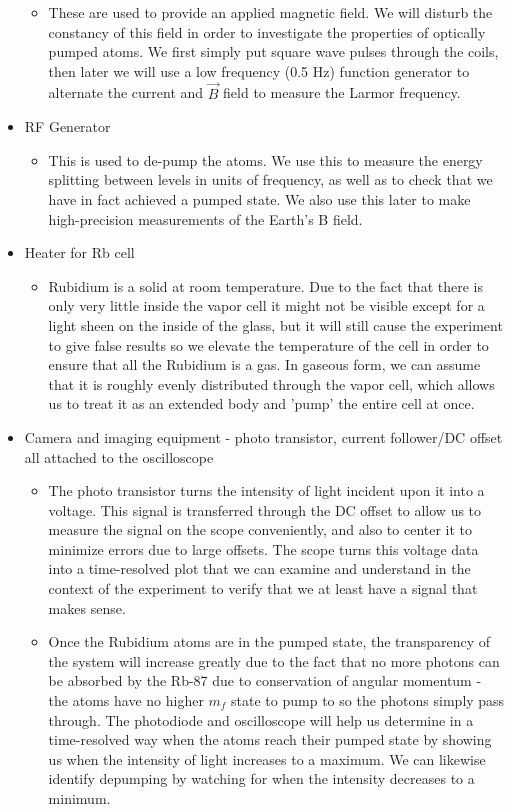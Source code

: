 \documentclass{article}
\begin{document}
\begin{itemize}
\begin{itemize}
      \item These are used to provide an applied magnetic field.  We will disturb the constancy of this field in order to investigate the properties of optically pumped atoms.  We first simply put square wave pulses through the coils, then later we will use a low frequency (0.5 Hz) function generator to alternate the current and $\vec{B}$ field to measure the Larmor frequency.
    \end{itemize}
    \item RF Generator
    \begin{itemize}
      \item This is used to de-pump the atoms.  We use this to measure the energy splitting between levels in units of frequency, as well as to check that we have in fact achieved a pumped state.  We also use this later to make high-precision measurements of the Earth's B field.
    \end{itemize}
    \item Heater for Rb cell
    \begin{itemize}
      \item Rubidium is a solid at room temperature.  Due to the fact that there is only very little inside the vapor cell it might not be visible except for a light sheen on the inside of the glass, but it will still cause the experiment to give false results so we elevate the temperature of the cell in order to ensure that all the Rubidium is a gas.  In gaseous form, we can assume that it is roughly evenly distributed through the vapor cell, which allows us to treat it as an extended body and 'pump' the entire cell at once.
    \end{itemize}
    \item Camera and imaging equipment - photo transistor, current follower/DC offset all attached to the oscilloscope
    \begin{itemize}
      \item The photo transistor turns the intensity of light incident upon it into a voltage.  This signal is transferred through the DC offset to allow us to measure the signal on the scope conveniently, and also to center it to minimize errors due to large offsets.  The scope turns this voltage data into a time-resolved plot that we can examine and understand in the context of the experiment to verify that we at least have a signal that makes sense.
      \item Once the Rubidium atoms are in the pumped state, the transparency of the system will increase greatly due to the fact that no more photons can be absorbed by the Rb-87 due to conservation of angular momentum - the atoms have no higher $m_f$ state to pump to so the photons simply pass through.  The photodiode and oscilloscope will help us determine in a time-resolved way when the atoms reach their pumped state by showing us when the intensity of light increases to a maximum.  We can likewise identify depumping by watching for when the intensity decreases to a minimum.
    \end{itemize}
  \end{itemize}
\end{document}

